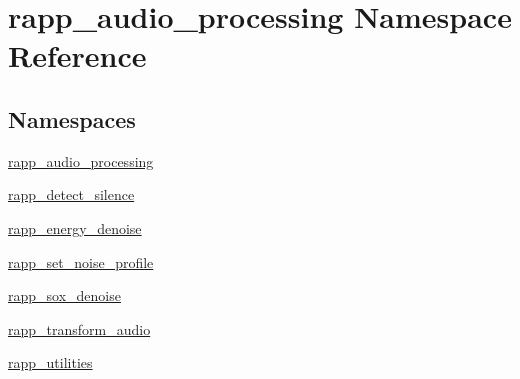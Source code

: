 \hypertarget{namespacerapp__audio__processing}{\section{rapp\-\_\-audio\-\_\-processing Namespace Reference}
\label{namespacerapp__audio__processing}
}
\subsection*{Namespaces}
\begin{DoxyCompactItemize}
\item 
\hyperlink{namespacerapp__audio__processing_1_1rapp__audio__processing}{rapp\-\_\-audio\-\_\-processing}
\item 
\hyperlink{namespacerapp__audio__processing_1_1rapp__detect__silence}{rapp\-\_\-detect\-\_\-silence}
\item 
\hyperlink{namespacerapp__audio__processing_1_1rapp__energy__denoise}{rapp\-\_\-energy\-\_\-denoise}
\item 
\hyperlink{namespacerapp__audio__processing_1_1rapp__set__noise__profile}{rapp\-\_\-set\-\_\-noise\-\_\-profile}
\item 
\hyperlink{namespacerapp__audio__processing_1_1rapp__sox__denoise}{rapp\-\_\-sox\-\_\-denoise}
\item 
\hyperlink{namespacerapp__audio__processing_1_1rapp__transform__audio}{rapp\-\_\-transform\-\_\-audio}
\item 
\hyperlink{namespacerapp__audio__processing_1_1rapp__utilities}{rapp\-\_\-utilities}
\end{DoxyCompactItemize}
